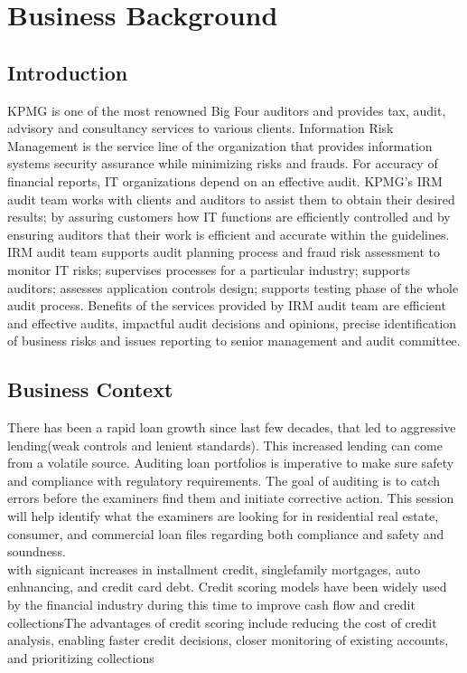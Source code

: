 %
%
%
%

\chapter{Business Background}\label{C.Business.Background}

\section{Introduction}\label{S.intro2}
KPMG is one of the most renowned Big Four auditors and provides tax, audit, advisory and consultancy services to various clients. Information Risk Management is the service line of the organization that provides information systems security assurance while minimizing risks and frauds. For accuracy of financial reports, IT organizations depend on an effective audit. KPMG's IRM audit team works with clients and auditors to assist them to obtain their desired results; by assuring customers how IT functions are efficiently controlled and by ensuring auditors that their work is efficient and accurate within the guidelines. IRM audit team supports audit planning process and fraud risk assessment to monitor IT risks; supervises processes for a particular industry; supports auditors; assesses application controls design; supports testing phase of the whole audit process. Benefits of the services provided by IRM audit team are efficient and effective audits, impactful audit decisions and opinions, precise identification of business risks and issues reporting to senior management and audit committee.\\

\section{Business Context}
There has been a rapid loan growth since last few decades, that led to aggressive lending(weak controls and lenient standards). This increased lending can come from a volatile source. Auditing loan portfolios is imperative to make sure safety and compliance with regulatory requirements. 
The goal of auditing is to catch errors before the examiners find them and initiate corrective action. This session will help identify what the examiners are looking for in residential real estate, consumer, and commercial loan files regarding both compliance and safety and soundness.\\

with signicant increases in installment credit, singlefamily mortgages, auto enhnancing, and credit card debt. Credit scoring models have been widely used by the financial industry during this time to improve cash flow and credit collectionsThe advantages of credit scoring include reducing the cost of credit analysis, enabling faster credit decisions, closer monitoring of existing accounts, and prioritizing collections
 